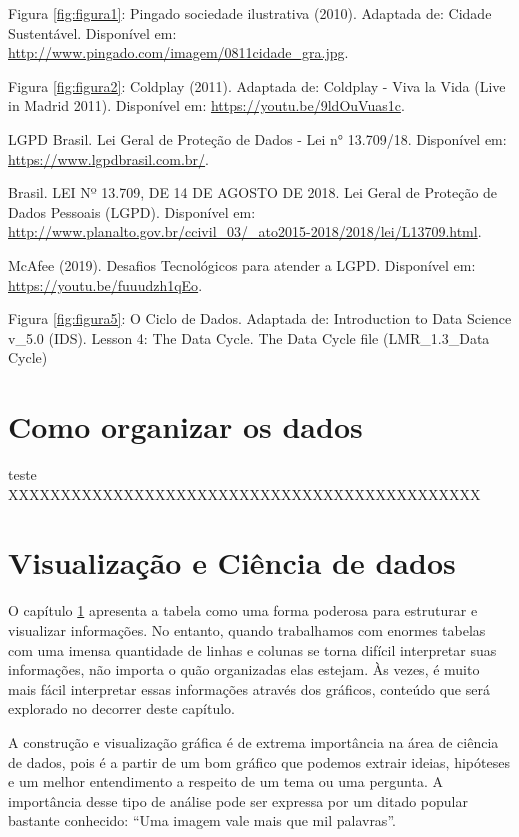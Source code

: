 \documentclass[
  portuguese,
  oneside]{book}
\begin{document}
Figura \ref{fig:figura1}: Pingado sociedade ilustrativa (2010). Adaptada de: Cidade Sustentável. Disponível em: \url{http://www.pingado.com/imagem/0811cidade_gra.jpg}.

Figura \ref{fig:figura2}: Coldplay (2011). Adaptada de: Coldplay - Viva la Vida (Live in Madrid 2011). Disponível em: \url{https://youtu.be/9ldOuVuas1c}.

LGPD Brasil. Lei Geral de Proteção de Dados - Lei n° 13.709/18. Disponível em: \url{https://www.lgpdbrasil.com.br/}.

Brasil. LEI Nº 13.709, DE 14 DE AGOSTO DE 2018. Lei Geral de Proteção de Dados Pessoais (LGPD). Disponível em: \url{http://www.planalto.gov.br/ccivil_03/_ato2015-2018/2018/lei/L13709.html}.

McAfee (2019). Desafios Tecnológicos para atender a LGPD. Disponível em: \url{https://youtu.be/fuuudzh1qEo}.

Figura \ref{fig:figura5}: O Ciclo de Dados. Adaptada de: Introduction to Data Science v\_5.0 (IDS). Lesson 4: The Data Cycle. The Data Cycle file (LMR\_1.3\_Data Cycle)

\hypertarget{c02}{%
\chapter{Como organizar os dados}\label{c02}}

teste XXXXXXXXXXXXXXXXXXXXXXXXXXXXXXXXXXXXXXXXXXXXX

\hypertarget{c03}{%
\chapter{Visualização e Ciência de dados}\label{c03}}

O capítulo \ref{c02} apresenta a tabela como uma forma poderosa para estruturar e visualizar informações. No entanto, quando trabalhamos com enormes tabelas com uma imensa quantidade de linhas e colunas se torna difícil interpretar suas informações, não importa o quão organizadas elas estejam. Às vezes, é muito mais fácil interpretar essas informações através dos gráficos, conteúdo que será explorado no decorrer deste capítulo.

A construção e visualização gráfica é de extrema importância na área de ciência de dados, pois é a partir de um bom gráfico que podemos extrair ideias, hipóteses e um melhor entendimento a respeito de um tema ou uma pergunta. A importância desse tipo de análise pode ser expressa por um ditado popular bastante conhecido: ``Uma imagem vale mais que mil palavras''.
\end{document}
